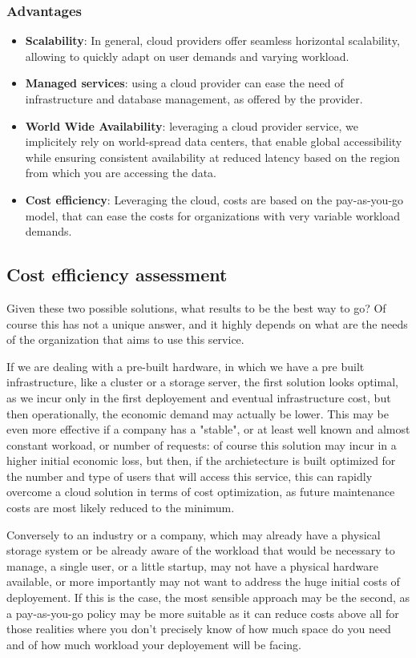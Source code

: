 \documentclass{article}
\begin{document}
	\subsubsection{Advantages}
	\begin{itemize}
		\item \textbf{Scalability}: In general, cloud providers offer seamless horizontal scalability, allowing to quickly adapt on user demands and varying workload.
		\item \textbf{Managed services}: using a cloud provider can ease the need of infrastructure and database management, as offered by the provider.
		\item \textbf{World Wide Availability}: leveraging a cloud provider service, we implicitely rely on world-spread data centers, that enable global accessibility while ensuring consistent availability at reduced latency based on the region from which you are accessing the data.
		\item \textbf{Cost efficiency}: Leveraging the cloud, costs are based on the pay-as-you-go model, that can ease the costs for organizations with very variable workload demands.
	\end{itemize}
	
	\subsection{Cost efficiency assessment}
	Given these two possible solutions, what results to be the best way to go? Of course this has not a unique answer, and it highly depends on what are the needs of the organization that aims to use this service.
	
	If we are dealing with a pre-built hardware, in which we have a pre built infrastructure, like a cluster or a storage server, the first solution looks optimal, as we incur only in the first deployement and eventual infrastructure cost, but then operationally, the economic demand may actually be lower. This may be even more effective if a company has a "stable", or at least well known and almost constant workoad, or number of requests: of course this solution may incur in a higher initial economic loss, but then, if the archietecture is built optimized for the number and type of users that will access this service, this can rapidly overcome a cloud solution in terms of cost optimization, as future maintenance costs are most likely reduced to the minimum.
	
	Conversely to an industry or a company, which may already have a physical storage system or be already aware of the workload that would be necessary to manage, a single user, or a little startup, may not have a physical hardware available, or more importantly may not want to address the huge initial costs of deployement. If this is the case, the most sensible approach may be the second, as a pay-as-you-go policy may be more suitable as it can reduce costs above all for those realities where you don't precisely know of how much space do you need and of how much workload your deployement will be facing.
	
\end{document}
